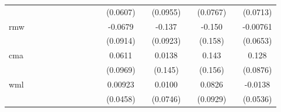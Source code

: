 \begin{table}[htbp]
\begin{tabular}{l*{16}{c}}
                    &                     &                     &                     &                     &                     &                     &                     &                     &                     &    (0.0607)         &                     &    (0.0955)         &                     &    (0.0767)         &                     &    (0.0713)         \\
[1em]
rmw                 &                     &                     &                     &                     &                     &                     &                     &                     &                     &     -0.0679         &                     &      -0.137         &                     &      -0.150         &                     &    -0.00761         \\
                    &                     &                     &                     &                     &                     &                     &                     &                     &                     &    (0.0914)         &                     &    (0.0923)         &                     &     (0.158)         &                     &    (0.0653)         \\
[1em]
cma                 &                     &                     &                     &                     &                     &                     &                     &                     &                     &      0.0611         &                     &      0.0138         &                     &       0.143         &                     &       0.128         \\
                    &                     &                     &                     &                     &                     &                     &                     &                     &                     &    (0.0969)         &                     &     (0.145)         &                     &     (0.156)         &                     &    (0.0876)         \\
[1em]
wml                 &                     &                     &                     &                     &                     &                     &                     &                     &                     &     0.00923         &                     &      0.0100         &                     &      0.0826         &                     &     -0.0138         \\
                    &                     &                     &                     &                     &                     &                     &                     &                     &                     &    (0.0458)         &                     &    (0.0746)         &                     &    (0.0929)         &                     &    (0.0536)         \\

\end{tabular}
\end{table}
